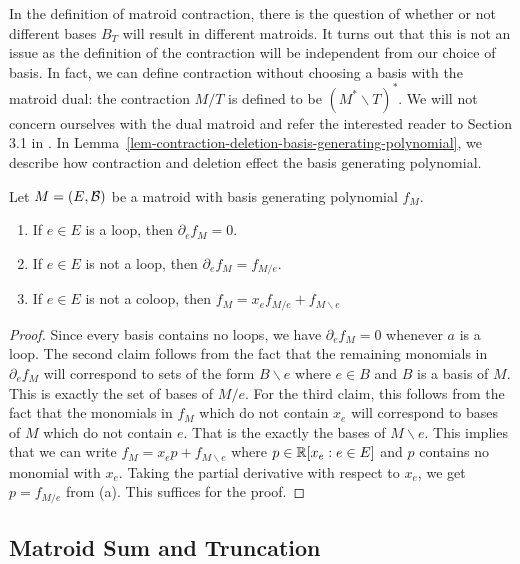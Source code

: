 \documentclass{puthesis-UG}
\begin{document}
In the definition of matroid contraction, there is the question of whether or not different bases $B_T$ will result in different matroids. It turns out that this is not an issue as the definition of the contraction will be independent from our choice of basis. In fact, we can define contraction without choosing a basis with the matroid dual: the contraction $M / T$ is defined to be $(M^* \backslash T)^*$. We will not concern ourselves with the dual matroid and refer the interested reader to Section 3.1 in \cite{10.5555/1197093}. In Lemma~\ref{lem-contraction-deletion-basis-generating-polynomial}, we describe how contraction and deletion effect the basis generating polynomial. 

\begin{lem} \label{lem-contraction-deletion-basis-generating-polynomial}
	Let $M = (E, \mathcal{B})$ be a matroid with basis generating polynomial $f_M$.
	\begin{enumerate}[label = (\alph*)]
		\item If $e \in E$ is a loop, then $\partial_e f_M = 0$. 
		\item If $e \in E$ is not a loop, then $\partial_e f_M = f_{M/e}$. 
		\item If $e \in E$ is not a coloop, then $f_M = x_e f_{M/e} + f_{M \backslash e}$
	\end{enumerate}
\end{lem}

\begin{proof}
	Since every basis contains no loops, we have $\partial_e f_M = 0$ whenever $a$ is a loop. The second claim follows from the fact that the remaining monomials in $\partial_e f_M$ will correspond to sets of the form $B \backslash e$ where $e \in B$ and $B$ is a basis of $M$. This is exactly the set of bases of $M / e$. For the third claim, this follows from the fact that the monomials in $f_M$ which do not contain $x_e$ will correspond to bases of $M$ which do not contain $e$. That is the exactly the bases of $M \backslash e$. This implies that we can write $f_M = x_e p + f_{M \backslash e}$ where $p \in \mathbb{R}[x_e : e \in E]$ and $p$ contains no monomial with $x_e$. Taking the partial derivative with respect to $x_e$, we get $p = f_{M / e}$ from (a). This suffices for the proof. 
\end{proof}

\subsection{Matroid Sum and Truncation}
\end{document}
